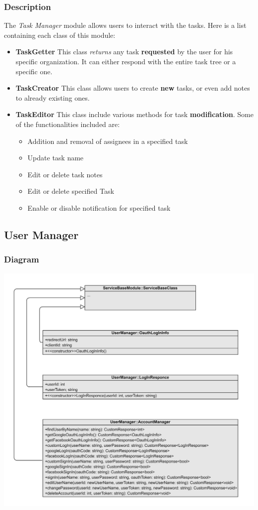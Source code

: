 \documentclass{article}
\begin{document}
\subsubsection{Description}
The \textit{Task Manager} module allows users to interact with the tasks. Here is a list containing each class of this module:
\begin{itemize}
    \item \textbf{TaskGetter}
    This class \textit{returns} any task \textbf{requested} by the user for his specific organization. It can either respond with the entire task tree or a specific one.
    \item \textbf{TaskCreator}
    This class allows users to create \textbf{new} tasks, or even add notes to already existing ones.
    \item \textbf{TaskEditor}
    This class include various methods for task \textbf{modification}. Some of the functionalities included are:
    \begin{itemize}
        \item Addition and removal of assignees in a specified task
        \item Update task name
        \item Edit or delete task notes
        \item Edit or delete specified Task
        \item Enable or disable notification for specified task
    \end{itemize}
\end{itemize}
\subsection{User Manager}

\subsubsection{Diagram}

\includegraphics[width=\textwidth,height=\textheight,keepaspectratio]{images/class_diagram/user_manager.jpg}
\end{document}
